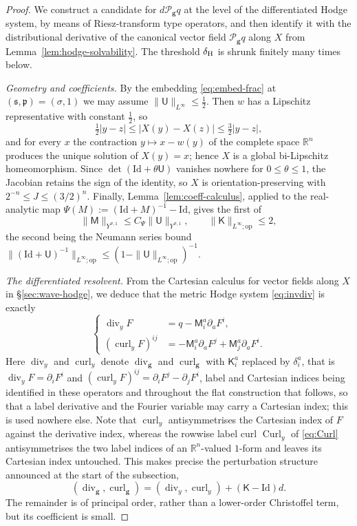 \documentclass[11pt,reqno]{amsart}
\theoremstyle{plain}
\theoremstyle{definition}
\theoremstyle{remark}
\numberwithin{equation}{section}
\DeclareMathOperator{\Div}{div}
\DeclareMathOperator{\curl}{curl}
\DeclareMathOperator{\Curl}{Curl}
\newcommand{\sreg}{\mathfrak s}
\newcommand{\preg}{\mathfrak p}
\newcommand{\Ufield}{\mathsf U}
\newcommand{\Kmat}{\mathsf K}
\newcommand{\Mmat}{\mathsf M}
\newcommand{\gmetric}{\mathbf g}
\newcommand{\Real}{\mathbb R}
\newcommand{\Rn}{\Real^n}
\begin{document}
\begin{proof}
We construct a candidate for $d\mathcal P_{\gmetric}q$ at the level of the
differentiated Hodge system, by means of Riesz-transform type operators, and
then identify it with the distributional derivative of the canonical vector field
$\mathcal P_{\gmetric}q$ along $X$ from Lemma~\ref{lem:hodge-solvability}.  The threshold
$\delta_{\rm H}$ is shrunk finitely many times below.

\emph{Geometry and coefficients.}
By the embedding \eqref{eq:embed-frac} at $(\sreg,\preg)=(\sigma,1)$ we may
assume $\|\Ufield\|_{L^\infty}\le\tfrac12$.  Then
$w$ has a Lipschitz representative with constant $\tfrac12$, so
\[
 \tfrac12|y-z|\le|X(y)-X(z)|\le\tfrac32|y-z|,
\]
and for every $x$ the contraction $y\mapsto x-w(y)$ of the complete space
$\Rn$ produces the unique solution of $X(y)=x$; hence $X$ is a global
bi-Lipschitz homeomorphism.  Since $\det(\mathrm{Id}+\theta\Ufield)$ vanishes
nowhere for $0\le\theta\le1$, the Jacobian retains the sign of the identity,
so $X$ is orientation-preserving with $2^{-n}\le J\le(3/2)^n$.  Finally, Lemma~\ref{lem:coeff-calculus}, applied to the real-analytic map
$\Psi(M):=(\mathrm{Id}+M)^{-1}-\mathrm{Id}$, gives the first of
\begin{equation}
    \|\Mmat\|_{Y^{\sigma,1}}\le C_\Psi\|\Ufield\|_{Y^{\sigma,1}},
 \qquad
 \|\Kmat\|_{L^\infty;\mathrm{op}}\le2 ,
\end{equation}
the second being the Neumann series bound
$\|(\mathrm{Id}+\Ufield)^{-1}\|_{L^\infty;\mathrm{op}}
\le(1-\|\Ufield\|_{L^\infty;\mathrm{op}})^{-1}$.

\emph{The differentiated resolvent.}
From the Cartesian calculus for vector fields along $X$ in \S\ref{sec:wave-hodge}, we deduce that the metric Hodge system \eqref{eq:invdiv} is exactly
\begin{equation}\label{eq:label-hodge-perturbation}
 \begin{cases}
  \Div_{y}F
    &=q-\Mmat^a_i\partial_aF^i,\\
  (\curl_{y}F)^{ij}
    &=-\Mmat^a_i\partial_aF^j
      +\Mmat^a_j\partial_aF^i.
 \end{cases}
\end{equation}
Here $\Div_y$ and $\curl_y$ denote $\Div_{\gmetric}$ and $\curl_{\gmetric}$ with
$\Kmat^a_i$ replaced by $\delta^a_i$, that is
$\Div_yF=\partial_iF^i$ and $(\curl_yF)^{ij}=\partial_iF^j-\partial_jF^i$, label and Cartesian indices being identified in these operators and
throughout the flat construction that follows, so that a label derivative and
the Fourier variable may carry a Cartesian index; this is used nowhere else.
Note that $\curl_y$ antisymmetrises the Cartesian index of $F$ against the
derivative index, whereas the rowwise label curl $\Curl_y$ of
\eqref{eq:Curl} antisymmetrises the two label indices of an
$\Rn$-valued $1$-form and leaves its Cartesian index untouched.  This makes
precise the perturbation structure announced at the start of the subsection,
\[
 (\Div_{\gmetric},\curl_{\gmetric})
 = (\Div_{y},\curl_{y})+(\Kmat-\mathrm{Id})d .
\]
The remainder is of principal order, rather than a lower-order Christoffel
term, but its coefficient is small.


\end{proof}
\end{document}
